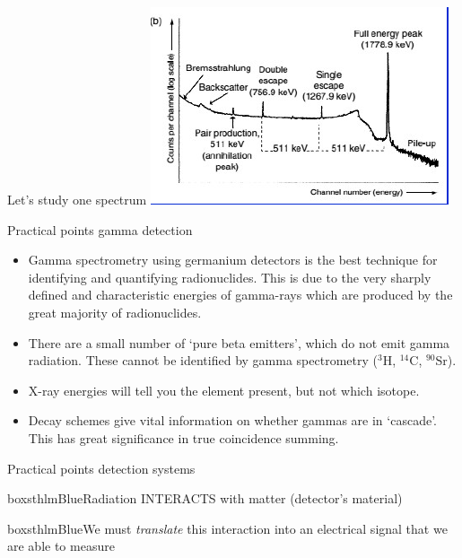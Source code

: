 \begin{frame}[allowframebreaks]{Let's study one spectrum}
\centering
\includegraphics[scale=0.6]{figures/specal28.png}

\end{frame}


\begin{frame}{Practical points gamma detection}


{\small
\begin{itemize}
\item Gamma spectrometry using germanium detectors is the best technique for identifying and quantifying radionuclides. This is due to the very sharply defined and characteristic energies of gamma-rays which are produced by the great majority of radionuclides. 
\item There are a small number of ‘pure beta emitters’, which do not emit gamma radiation. These cannot be identified by gamma spectrometry ($^{3}$H, $^{14}$C, $^{90}$Sr). 
\item X-ray energies will tell you the element present, but not which isotope. 
\item Decay schemes give vital information on whether gammas are in ‘cascade’. This has great significance in true coincidence summing.
\end{itemize}
}


\end{frame}

\begin{frame}{Practical points detection systems}

\begin{beamercolorbox}[wd=\linewidth,ht=5ex,dp=3ex]{boxsthlmBlue}\centering Radiation INTERACTS with matter (detector's material)\end{beamercolorbox}


\pause
\centering \arrowdown

\pause
{}\begin{beamercolorbox}[wd=\linewidth,ht=5ex,dp=3ex]{boxsthlmBlue}\centering We must \emph{translate} this interaction into an electrical signal that we are able to measure\end{beamercolorbox}



\end{frame}



